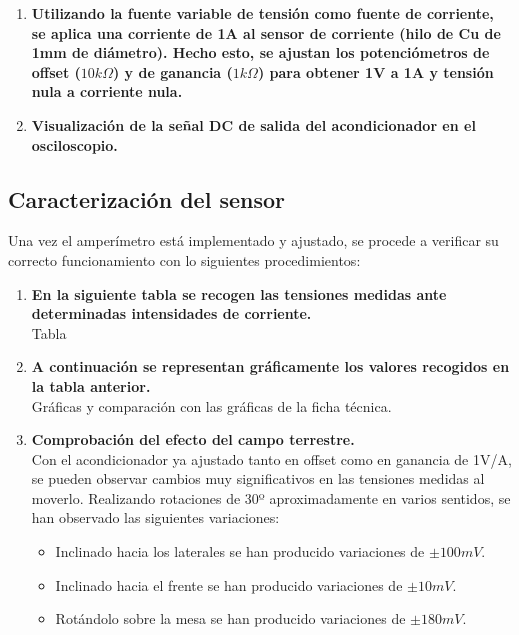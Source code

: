 \begin{enumerate}
    \item \textbf{Utilizando la fuente variable de tensión como fuente de corriente, se aplica una corriente de 1A al sensor de corriente (hilo de Cu de 1mm de diámetro). Hecho esto, se ajustan los potenciómetros de offset ($10k\Omega$) y de ganancia ($1k\Omega$) para obtener 1V a 1A y tensión nula a corriente nula.}
    \item \textbf{Visualización de la señal DC de salida del acondicionador en el osciloscopio.} \\
\end{enumerate}

\subsection{Caracterización del sensor}

Una vez el amperímetro está implementado y ajustado, se procede a verificar su correcto funcionamiento con lo siguientes procedimientos:

\begin{enumerate}
    \item \textbf{En la siguiente tabla se recogen las tensiones medidas ante determinadas intensidades de corriente.} \\
    Tabla
    \item \textbf{A continuación se representan gráficamente los valores recogidos en la tabla anterior.} \\
    Gráficas y comparación con las gráficas de la ficha técnica.\todo{}
    \item \textbf{Comprobación del efecto del campo terrestre.} \\
    Con el acondicionador ya ajustado tanto en offset como en ganancia de 1V/A, se pueden observar cambios muy significativos en las tensiones medidas al moverlo. Realizando rotaciones de 30º aproximadamente en varios sentidos, se han observado las siguientes variaciones:
    \begin{itemize}
        \item Inclinado hacia los laterales se han producido variaciones de $±100mV$.
        \item Inclinado hacia el frente se han producido variaciones de $±10mV$.
        \item Rotándolo sobre la mesa se han producido variaciones de $±180mV$.
    \end{itemize}
\end{enumerate}
